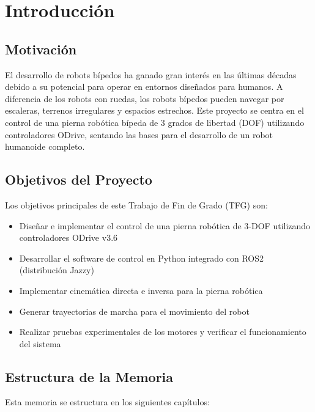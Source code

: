 \chapter{Introducción}

\section{Motivación}

El desarrollo de robots bípedos ha ganado gran interés en las últimas décadas debido a su potencial para operar en entornos diseñados para humanos. A diferencia de los robots con ruedas, los robots bípedos pueden navegar por escaleras, terrenos irregulares y espacios estrechos. Este proyecto se centra en el control de una pierna robótica bípeda de 3 grados de libertad (DOF) utilizando controladores ODrive, sentando las bases para el desarrollo de un robot humanoide completo.

\section{Objetivos del Proyecto}

Los objetivos principales de este Trabajo de Fin de Grado (TFG) son:

\begin{itemize}
    \item Diseñar e implementar el control de una pierna robótica de 3-DOF utilizando controladores ODrive v3.6
    \item Desarrollar el software de control en Python integrado con ROS2 (distribución Jazzy)
    \item Implementar cinemática directa e inversa para la pierna robótica
    \item Generar trayectorias de marcha para el movimiento del robot
    \item Realizar pruebas experimentales de los motores y verificar el funcionamiento del sistema
\end{itemize}

\section{Estructura de la Memoria}

Esta memoria se estructura en los siguientes capítulos:

